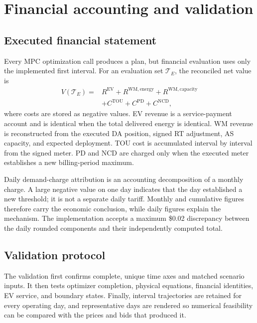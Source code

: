 \documentclass[final,5p,times]{elsarticle}
\newcommand{\EV}{\mathrm{EV}}
\newcommand{\TOU}{\mathrm{TOU}}
\newcommand{\PD}{\mathrm{PD}}
\newcommand{\NCD}{\mathrm{NCD}}
\newcommand{\WM}{\mathrm{WM}}
\begin{document}
\section{Financial accounting and validation}
\label{sec:accounting}

\subsection{Executed financial statement}
Every MPC optimization call produces a plan, but financial evaluation uses only the implemented first interval. For an evaluation set $\mathcal T_E$, the reconciled net value is
\begin{align}
V(\mathcal T_E)={}&R^{\EV}+R^{\WM,\mathrm{energy}}
+R^{\WM,\mathrm{capacity}}\nonumber\\
&+C^{\TOU}+C^{\PD}+C^{\NCD},
\label{eq:financial_identity}
\end{align}
where costs are stored as negative values. EV revenue is a service-payment account and is identical when the total delivered energy is identical. WM revenue is reconstructed from the executed DA position, signed RT adjustment, AS capacity, and expected deployment. TOU cost is accumulated interval by interval from the signed meter. PD and NCD are charged only when the executed meter establishes a new billing-period maximum.

Daily demand-charge attribution is an accounting decomposition of a monthly charge. A large negative value on one day indicates that the day established a new threshold; it is not a separate daily tariff. Monthly and cumulative figures therefore carry the economic conclusion, while daily figures explain the mechanism. The implementation accepts a maximum \$0.02 discrepancy between the daily rounded components and their independently computed total.

\subsection{Validation protocol}
The validation first confirms complete, unique time axes and matched scenario
inputs. It then tests optimizer completion, physical equations, financial
identities, EV service, and boundary states. Finally, interval trajectories are retained for every operating day, and representative days are rendered so numerical feasibility can be compared with the prices and bids that produced it.
\end{document}
